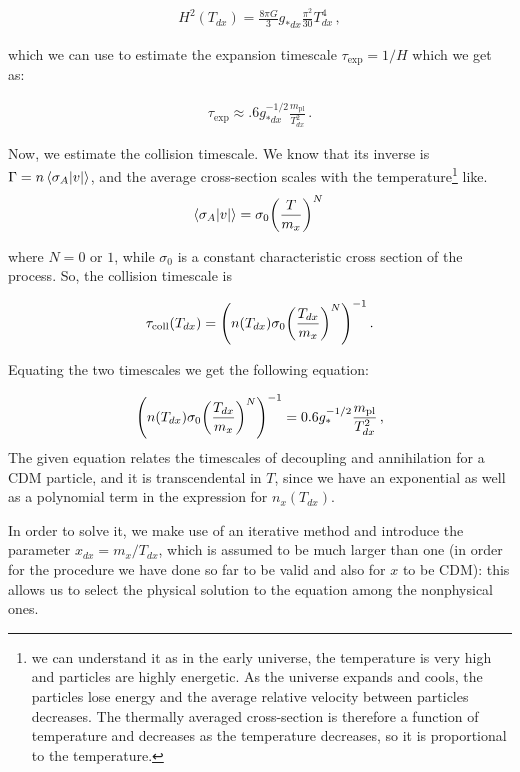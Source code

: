 \begin{align}
    H^2 (T_{dx}) = \frac{8 \pi G}{3} g_{*dx} \frac{\pi^2}{30} T_{dx}^{4} \,,
\end{align}

which we can use to estimate the expansion timescale \(\tau_{\text{exp}}= 1/H\) which we get as:

\begin{align}
    \tau_{\text{exp}} \approx \num{.6} g_{*dx}^{-1/2} \frac{m _{\text{pl}}}{T_{dx}^2} \,.
\end{align}

\hspace{0.5cm}Now, we estimate the collision timescale. We know that its inverse is \(\Gamma = n \expval{\sigma _A \abs{v}}\), and the average cross-section scales with the temperature\footnote{we can understand it as in the early universe, the temperature is very high and particles are highly energetic. As the universe expands and cools, the particles lose energy and the average relative velocity between particles decreases. The thermally averaged cross-section is therefore a function of temperature and decreases as the temperature decreases, so it is proportional to the temperature. } like. 
\begin{align}
    \expval{\sigma _A \abs{v}} = \sigma_0 \qty(\frac{T}{m_x})^{N}\,
\end{align}


where \(N = 0\) or \(1\), while \(\sigma_0 \) is a constant characteristic cross section of the process. So, the collision timescale is

\begin{align}
    \tau _{\text{coll}} (T_{dx}) = \qty(n(T_{dx}) \sigma _0 \qty(\frac{T_{dx}}{m_x})^{N})^{-1}\,.
\end{align}

Equating the two timescales we get the following equation:

\begin{align}
    \qty(n(T_{dx}) \sigma _0 \qty(\frac{T_{dx}}{m_x})^{N})^{-1} = \num{.6} g_{*}^{-1/2} \frac{m_{\text{pl}}}{T_{dx}^2}\,,
\end{align}
The given equation relates the timescales of decoupling and annihilation for a CDM particle, and it is transcendental in \(T\), since we have an exponential as well as a polynomial term in the expression for \(n_x(T_{dx})\).

\hspace{0.5cm}In order to solve it, we make use of an iterative method and introduce the parameter  \(x_{dx} = m_x / T_{dx}\), which is assumed to be much larger than one (in order for the procedure we have done so far to be valid and also for \(x\) to be CDM): this allows us to select the physical solution to the equation among the nonphysical ones. 

